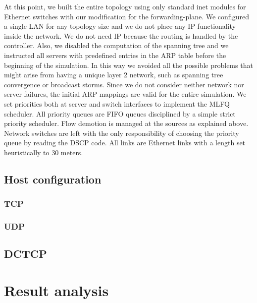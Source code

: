 At this point, we built the entire topology using only standard inet modules for Ethernet switches with our modification for the forwarding-plane. We configured a single LAN for any topology size and we do not place any IP functionality inside the network. We do not need IP because the routing is handled by the controller. Also, we disabled the computation of the spanning tree and we instructed all servers with predefined entries in the ARP table before the beginning of the simulation. In this way we avoided all the possible problems that might arise from having a unique layer 2 network, such as spanning tree convergence or broadcast storms. Since we do not consider neither network nor server failures, the initial ARP mappings are valid for the entire simulation. We set priorities both at server and switch interfaces to implement the MLFQ scheduler. All priority queues are FIFO queues disciplined by a simple strict priority scheduler. Flow demotion is managed at the sources as explained above. Network switches are left with the only responsibility of choosing the priority queue by reading the DSCP code. All links are Ethernet links with a length set heuristically to 30 meters.
\subsection{Host configuration}
\subsubsection{TCP}
\subsubsection{UDP}
\subsection{DCTCP}

\section{Result analysis}
